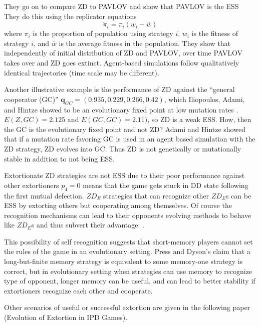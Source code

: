 They go on to compare ZD to PAVLOV and show that PAVLOV is the ESS  They do this using the replicator equations
\[
\dot{\pi}_i = \pi_i(w_i - \bar{w})
\]
where $\pi_i$ is the proportion of population using strategy $i$, $w_i$ is the fitness of strategy $i$, and $\bar{w}$ is the average fitness in the population. They show that independently of initial distribution of ZD and PAVLOV, over time PAVLOV takes over and ZD goes extinct. Agent-based simulations follow qualitatively identical trajectories (time scale may be different).

Another illustrative example is the performance of ZD against the ``general cooperator (GC)'' $\mathbf{q}_{GC} = (0.935, 0.229, 0.266, 0.42)$, which Iliopoulos, Adami, and Hintze showed to be an evolutionary fixed point at low mutation rates \cite{iliopoulos_2010}. $E(Z, GC) = 2.125$ and $E(GC, GC) = 2.11)$, so ZD is a weak ESS. How, then the GC is the evolutionary fixed point and not ZD? Adami and Hintze showed that if a mutation rate favoring GC is used in an agent based simulation with the ZD strategy, ZD evolves into GC. Thus ZD is not genetically or mutationally stable in addition to not being ESS.

Extortionate ZD strategies are not ESS due to their poor performance against other extortioners $p_4 = 0$ means that the game gets stuck in DD state following the first mutual defection. $ZD_E$ strategies that can recognize other $ZD_E$s can be ESS by extorting others but cooperating among themselves. Of course the recognition mechanisms can lead to their opponents evolving methods to behave like $ZD_E$s and thus subvert their advantage. .

This possibility of self recognition suggests that short-memory players cannot set the rules of the game in an evolutionary setting. Press and Dyson's claim that a long-but-finite memory strategy is equivalent to some memory-one strategy is correct, but in evolutionary setting when strategies can use memory to recognize type of opponent, longer memory can be useful, and can lead to better stability if extortioners recognize each other and cooperate.

Other scenarios of useful or successful extortion are given in the following paper (Evolution of Extortion in IPD Games).

